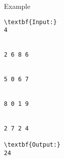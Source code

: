 Example
\begin{verbatim}
\textbf{Input:}
4


2 6 8 6 


5 0 6 7 


8 0 1 9 


2 7 2 4

\textbf{Output:}
24


\end{verbatim}